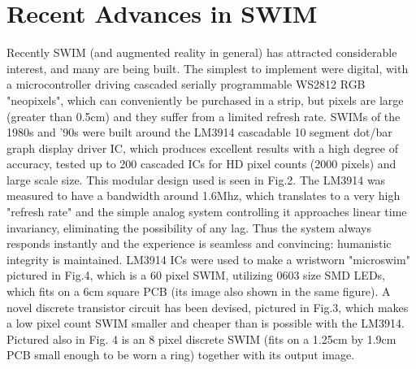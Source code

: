 \documentclass{sigchi-ext}
\begin{document}
\section{Recent Advances in SWIM}
Recently SWIM (and augmented reality in general)
has attracted considerable interest, and many are being built.
The simplest to implement were digital, with a microcontroller
driving cascaded serially programmable WS2812 RGB "neopixels", which can
conveniently be purchased in a strip, but pixels are large (greater than 0.5cm)
and they suffer from a limited refresh rate.  SWIMs of the
1980s and '90s were built around the
LM3914 cascadable 10 segment dot/bar graph display driver IC, which produces
excellent results with a high degree of accuracy, tested up to 200
cascaded ICs for HD pixel counts (2000 pixels)
and large scale size.  This modular design used
is seen in Fig.2.  The LM3914 was measured to have a bandwidth around
1.6Mhz,
which translates to a very high "refresh rate" and the simple analog system
controlling it approaches linear time invariancy, eliminating the possibility
of any lag.  Thus the system always responds instantly and the experience is
seamless and convincing: humanistic integrity is maintained.
LM3914 ICs were
used to make a wristworn "microswim" pictured in Fig.4, which is a 60 pixel
SWIM, utilizing 0603 size SMD LEDs, which fits on a 6cm square PCB
(its image also shown in the same figure).
A novel discrete transistor circuit
has been devised, pictured in Fig.3, which makes a low pixel count SWIM smaller
and cheaper than is possible with the LM3914. Pictured also in Fig. 4
is an 8 pixel
discrete SWIM (fits on a 1.25cm by 1.9cm PCB small enough to be worn a ring)
together with its output image.
%
\end{document}
